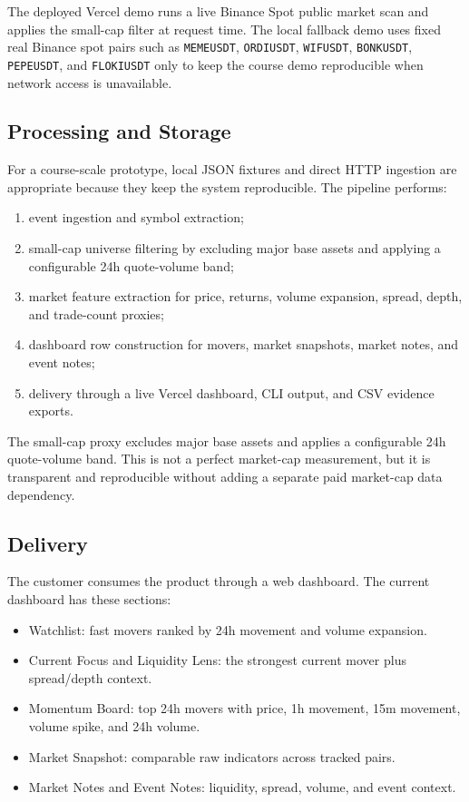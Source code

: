 \documentclass[11pt]{article}
\begin{document}
The deployed Vercel demo runs a live Binance Spot public market scan and applies the small-cap filter at request time. The local fallback demo uses fixed real Binance spot pairs such as \texttt{MEMEUSDT}, \texttt{ORDIUSDT}, \texttt{WIFUSDT}, \texttt{BONKUSDT}, \texttt{PEPEUSDT}, and \texttt{FLOKIUSDT} only to keep the course demo reproducible when network access is unavailable.

\subsection{Processing and Storage}

For a course-scale prototype, local JSON fixtures and direct HTTP ingestion are appropriate because they keep the system reproducible. The pipeline performs:
\begin{enumerate}
  \item event ingestion and symbol extraction;
  \item small-cap universe filtering by excluding major base assets and applying a configurable 24h quote-volume band;
  \item market feature extraction for price, returns, volume expansion, spread, depth, and trade-count proxies;
  \item dashboard row construction for movers, market snapshots, market notes, and event notes;
  \item delivery through a live Vercel dashboard, CLI output, and CSV evidence exports.
\end{enumerate}

The small-cap proxy excludes major base assets and applies a configurable 24h quote-volume band. This is not a perfect market-cap measurement, but it is transparent and reproducible without adding a separate paid market-cap data dependency.

\subsection{Delivery}

The customer consumes the product through a web dashboard. The current dashboard has these sections:
\begin{itemize}
  \item Watchlist: fast movers ranked by 24h movement and volume expansion.
  \item Current Focus and Liquidity Lens: the strongest current mover plus spread/depth context.
  \item Momentum Board: top 24h movers with price, 1h movement, 15m movement, volume spike, and 24h volume.
  \item Market Snapshot: comparable raw indicators across tracked pairs.
  \item Market Notes and Event Notes: liquidity, spread, volume, and event context.
\end{itemize}
\end{document}
